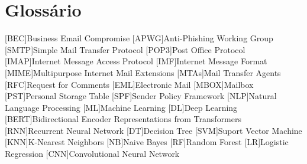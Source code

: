 \chapter{Glossário}

\footnotesize
\SingleSpacing

\begin{multicols}{2}
\begin{acronym}[AAAAAA]

	[BEC]{Business Email Compromise}
    [APWG]{Anti-Phishing Working Group}
	[SMTP]{Simple Mail Transfer Protocol}
	[POP3]{Post Office Protocol}
	[IMAP]{Internet Message Access Protocol}
	[IMF]{Internet Message Format}
	[MIME]{Multipurpose Internet Mail Extensions}
	[MTAs]{Mail Transfer Agents}
	[RFC]{Request for Comments}
	[EML]{Electronic Mail}
	[MBOX]{Mailbox}
	[PST]{Personal Storage Table}
	[SPF]{Sender Policy Framework}
	[NLP]{Natural Language Processing}
	[ML]{Machine Learning}
	[DL]{Deep Learning}
	[BERT]{Bidirectional Encoder Representations from Transformers}
	[RNN]{Recurrent Neural Network}
	[DT]{Decision Tree}
	[SVM]{Suport Vector Machine}
	[KNN]{K-Nearest Neighbors}
	[NB]{Naive Bayes}
	[RF]{Random Forest}
	[LR]{Logistic Regression}
	[CNN]{Convolutional Neural Network}

\end{acronym}
\end{multicols}

